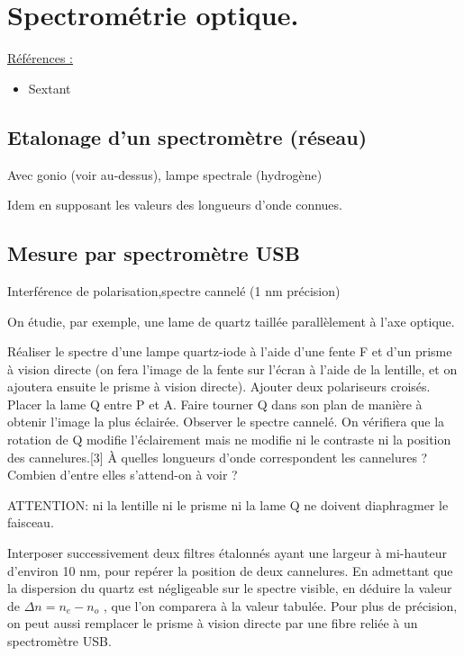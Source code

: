 \documentclass{article}%
\begin{document}
\section{Spectrométrie optique.}

\underline{Références :}
\begin{itemize}
	\item Sextant
\end{itemize}

\subsection{Etalonage d'un spectromètre (réseau)}

Avec gonio (voir au-dessus), lampe spectrale (hydrogène)

Idem en supposant les valeurs des longueurs d'onde connues.

\subsection{Mesure par spectromètre USB}
Interférence de polarisation,spectre cannelé (1 nm précision)

On étudie, par exemple, une lame de quartz taillée parallèlement à l'axe optique.

    Réaliser le spectre d'une lampe quartz-iode à l'aide d'une fente F et d'un prisme à vision directe (on fera l'image de la fente sur l'écran à l'aide de la lentille, et on ajoutera ensuite le prisme à vision directe). Ajouter deux polariseurs croisés. Placer la lame Q entre P et A. Faire tourner Q dans son plan de manière à obtenir l'image la plus éclairée. Observer le spectre cannelé. On vérifiera que la rotation de Q modifie l'éclairement mais ne modifie ni le contraste ni la position des cannelures.[3] À quelles longueurs d'onde correspondent les cannelures ? Combien d'entre elles s'attend-on à voir ?

ATTENTION: ni la lentille ni le prisme ni la lame Q ne doivent diaphragmer le faisceau.

    Interposer successivement deux filtres étalonnés ayant une largeur à mi-hauteur d'environ 10 nm, pour repérer la position de deux cannelures. En admettant que la dispersion du quartz est négligeable sur le spectre visible, en déduire la valeur de $\Delta n = n_e - n_o$ , que l'on comparera à la valeur tabulée. Pour plus de précision, on peut aussi remplacer le prisme à vision directe par une fibre reliée à un spectromètre USB.
\end{document}
